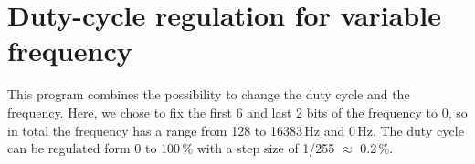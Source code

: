 \section{Duty-cycle regulation for variable frequency}

This program combines the possibility to change the duty cycle and the frequency. Here, we chose to fix the first 6 and last 2 bits of the frequency to 0, so in total the frequency has a range from 128 to 16383\,Hz and 0\,Hz. The duty cycle can be regulated form 0 to 100\,\% with a step size of 1/255 $\approx$ 0.2\,\%.





